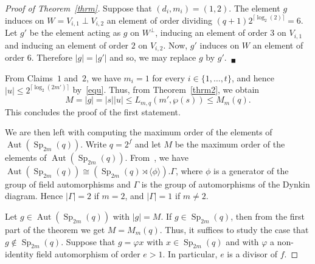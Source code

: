 \documentclass{amsart}
\begin{document}
\begin{proof}[Proof of Theorem~\ref{thrm}]
Suppose that $(d_{i},m_{i})=(1,2)$. 
The element $g$ induces on $W=V_{i,1}\perp V_{i,2}$ an element of order dividing 
$(q+1)2^{\lceil \log_2(2)\rceil}=6$. Let $g'$ be the element acting as $g$ on 
$W^\perp$, inducing an element of order $3$ on $V_{i,1}$ and inducing an element 
of order $2$ on $V_{i,2}$. Now, $g'$ induces on $W$ an element of order $6$. 
Therefore $|g|=|g'|$ and so, we may replace $g$ by $g'$.~$_\blacksquare$

\smallskip

From Claims~$1$ and~$2$, we have $m_i=1$ for every $i\in \{1,\ldots,t\}$, and hence $|u|\leq 2^{\lceil\log_2(2m')\rceil}$ by~\eqref{equ}. 
Thus, from Theorem~\ref{thrm2}, we obtain $$M=|g|=|s||u|\leq L_{m,q}(m',\wp(s))\leq M_m(q).$$
This concludes the proof of the first statement.

We are then left with computing the maximum order of the elements of ${\mathop{\mathrm{Aut}}}({\mathop{\mathrm{Sp}}}_{2m}(q))$. Write $q=2^f$ and let $M$ be the maximum order of the elements of ${\mathop{\mathrm{Aut}}}({\mathop{\mathrm{Sp}}}_{2m}(q))$. From~\cite[Table~$5$, page~xvi]{ATLAS},  we have ${\mathop{\mathrm{Aut}}}({\mathop{\mathrm{Sp}}}_{2m}(q))\cong ({\mathop{\mathrm{Sp}}}_{2m}(q)\rtimes \langle \phi\rangle).\Gamma$, where $\phi$ is a generator of the group of field automorphisms and $\Gamma$ is the group of automorphisms of the Dynkin diagram. Hence $|\Gamma|=2$ if $m=2$, and $|\Gamma|=1$ if $m\neq 2$. 

Let $g\in {\mathop{\mathrm{Aut}}}({\mathop{\mathrm{Sp}}}_{2m}(q))$ with $|g|=M$. If $g\in {\mathop{\mathrm{Sp}}}_{2m}(q)$, then from the first part of the theorem we get $M=M_m(q)$. Thus, it suffices to study the case that $g\notin{\mathop{\mathrm{Sp}}}_{2m}(q)$. Suppose that $g=\varphi x$ with $x\in {\mathop{\mathrm{Sp}}}_{2m}(q)$ and with $\varphi$ a non-identity field automorphism of order $e>1$. In particular, $e$ is a divisor of $f$. 


\end{proof}
\end{document}
